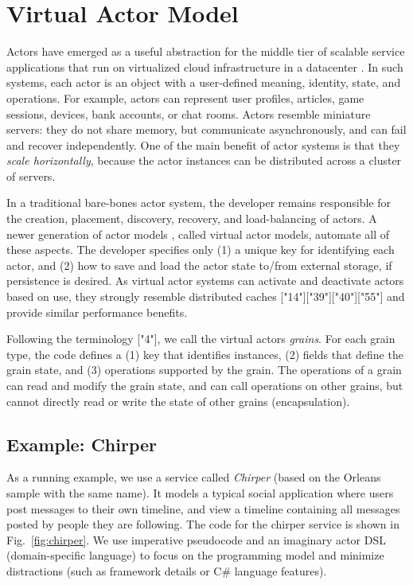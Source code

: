 \section{Virtual Actor Model}\label{sec:virtualactors}

Actors have emerged as a useful abstraction for the middle tier of scalable service applications that run on virtualized cloud infrastructure in a datacenter . In such systems, each actor is an object with a user-defined meaning, identity, state, and operations. For example, actors can represent user profiles, articles, game sessions, devices, bank accounts, or chat rooms. Actors resemble miniature servers: they do not share memory, but communicate asynchronously, and can fail and recover independently. One of the main benefit of actor systems is that they \emph{scale horizontally}, because the actor instances can be distributed across a cluster of servers.

In a traditional bare-bones actor system, the developer remains responsible for the creation, placement, discovery, recovery, and load-balancing of actors. A newer generation of actor models \cite{orleans,orbit,sfactors}, called virtual actor models, automate all of these aspects. The developer specifies only (1) a unique key for identifying each actor, and (2) how to save and load the actor state to/from external storage, if persistence is desired. As virtual actor systems can activate and deactivate actors based on use, they strongly resemble distributed caches ["14"]["39"]["40"]["55"] and provide similar performance benefits. 

Following the terminology ["4"], we call the virtual actors \emph{grains}. For each grain type, the code defines a (1) key that identifies instances, (2)  fields that define the grain state, and (3) operations supported by the grain. The operations of a grain can read and modify the grain state, and can call operations on other grains, but cannot directly read or write the state of other grains (encapsulation). 
 
\subsection{Example: Chirper}

As a running example, we use a service called \emph{Chirper} (based on the Orleans sample with the same name). It models a typical social application where users post messages to their own timeline, and view a timeline containing all messages posted by people they are following.
The code for the chirper service is shown in Fig.~\ref{fig:chirper}. We use imperative pseudocode and an imaginary actor DSL (domain-specific language) to focus on the programming model and minimize distractions (such as framework details or C\# language features). 

